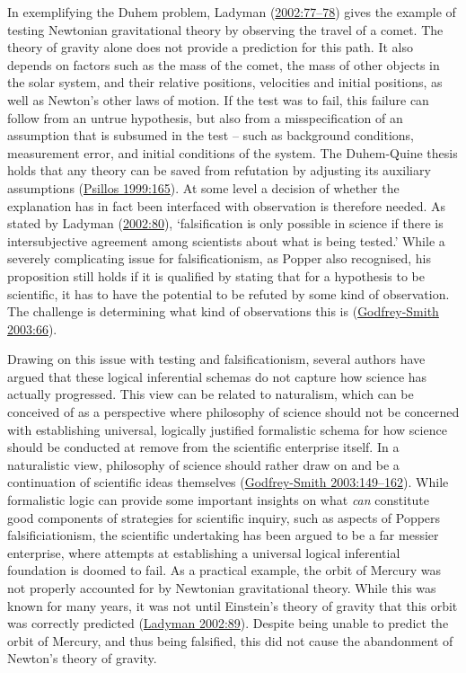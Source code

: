 \documentclass[
  12pt,
  a4paper,
  oneside]{book}
\begin{document}
In exemplifying the Duhem problem, Ladyman (\protect\hyperlink{ref-ladyman2002}{2002:77--78}) gives the example of testing Newtonian gravitational theory by observing the travel of a comet. The theory of gravity alone does not provide a prediction for this path. It also depends on factors such as the mass of the comet, the mass of other objects in the solar system, and their relative positions, velocities and initial positions, as well as Newton's other laws of motion. If the test was to fail, this failure can follow from an untrue hypothesis, but also from a misspecification of an assumption that is subsumed in the test -- such as background conditions, measurement error, and initial conditions of the system. The Duhem-Quine thesis holds that any theory can be saved from refutation by adjusting its auxiliary assumptions (\protect\hyperlink{ref-psillos1999}{Psillos 1999:165}). At some level a decision of whether the explanation has in fact been interfaced with observation is therefore needed. As stated by Ladyman (\protect\hyperlink{ref-ladyman2002}{2002:80}), `falsification is only possible in science if there is intersubjective agreement among scientists about what is being tested.' While a severely complicating issue for falsificationism, as Popper also recognised, his proposition still holds if it is qualified by stating that for a hypothesis to be scientific, it has to have the potential to be refuted by some kind of observation. The challenge is determining what kind of observations this is (\protect\hyperlink{ref-godfrey-smith2003}{Godfrey-Smith 2003:66}).

Drawing on this issue with testing and falsificationism, several authors have argued that these logical inferential schemas do not capture how science has actually progressed. This view can be related to naturalism, which can be conceived of as a perspective where philosophy of science should not be concerned with establishing universal, logically justified formalistic schema for how science should be conducted at remove from the scientific enterprise itself. In a naturalistic view, philosophy of science should rather draw on and be a continuation of scientific ideas themselves (\protect\hyperlink{ref-godfrey-smith2003}{Godfrey-Smith 2003:149--162}). While formalistic logic can provide some important insights on what \emph{can} constitute good components of strategies for scientific inquiry, such as aspects of Poppers falsificiationism, the scientific undertaking has been argued to be a far messier enterprise, where attempts at establishing a universal logical inferential foundation is doomed to fail. As a practical example, the orbit of Mercury was not properly accounted for by Newtonian gravitational theory. While this was known for many years, it was not until Einstein's theory of gravity that this orbit was correctly predicted (\protect\hyperlink{ref-ladyman2002}{Ladyman 2002:89}). Despite being unable to predict the orbit of Mercury, and thus being falsified, this did not cause the abandonment of Newton's theory of gravity.
\end{document}
